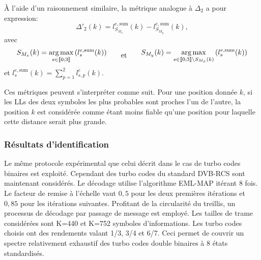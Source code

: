 À l'aide d'un raisonnement similaire, la métrique analogue à $\Delta_2$ a pour expression: 
\begin{equation}
	\Delta'_2(k) = l^{e,\text{sum}}_{S_{M_x}}(k)-l^{e,\text{sum}}_{S_{M_y}}(k),
\end{equation}
avec
\begin{equation*}	\begin{split}
	S_{M_x}(k) = \operatorname*{arg\,max}\limits_{s\in\llbracket0;3\rrbracket}\left(l^{e,\text{sum}}_s(k)\right)
	\end{split}\qquad\text{et}\qquad
	\begin{split}
		S_{M_y}(k) = \operatorname*{arg\,max}\limits_{s\in\llbracket0;3\rrbracket\setminus{S_{M_x}(k)}}\left(l^{e,\text{sum}}_s(k)\right)
	\end{split} 
\end{equation*}
et $l^{e,\text{sum}}_s(k) = \sum\limits_{p=1}^2l^e_{s,p}(k)$.

Ces métriques peuvent s'interpréter comme suit. Pour une position donnée $k$, si les LLs des deux symboles les 
plus probables sont proches l'un de l'autre, la position $k$ est considérée comme étant moins fiable qu'une position pour
laquelle cette distance serait plus grande.

\subsubsection{Résultats d'identification}
Le même protocole expérimental que celui décrit dans le cas de turbo codes binaires est exploité. Cependant des turbo codes du standard DVB-RCS
sont maintenant considérés. Le décodage utilise l'algorithme EML-MAP itérant 8 fois. Le facteur de remise à l'échelle 
vaut $0,5$ pour les deux premières itérations et $0,85$ pour les itérations suivantes. Profitant de la circularité du treillis, 
un processus de décodage par passage de message est employé. Les tailles de trame considérées sont K=440
et K=752 symboles d'informations. Les turbo codes choisis ont des rendements valant 1/3, 3/4 et 6/7. Ceci permet de 
couvrir un spectre relativement exhaustif des turbo codes double binaires à 8 états standardisés. 

